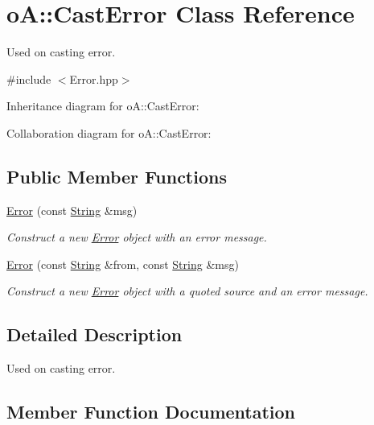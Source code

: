 \hypertarget{classo_a_1_1_cast_error}{}\section{oA\+:\+:Cast\+Error Class Reference}
\label{classo_a_1_1_cast_error}


Used on casting error.  




{\ttfamily \#include $<$Error.\+hpp$>$}



Inheritance diagram for oA\+:\+:Cast\+Error\+:


Collaboration diagram for oA\+:\+:Cast\+Error\+:
\subsection*{Public Member Functions}
\begin{DoxyCompactItemize}
\item 
\mbox{\hyperlink{classo_a_1_1_cast_error_a16d10704561d2b756722d71d8703089c}{Error}} (const \mbox{\hyperlink{classo_a_1_1_string}{String}} \&msg)
\begin{DoxyCompactList}\small\item\em Construct a new \mbox{\hyperlink{classo_a_1_1_error}{Error}} object with an error message. \end{DoxyCompactList}\item 
\mbox{\hyperlink{classo_a_1_1_cast_error_adf66492ca8b03fa14d09e5bba7cdacbd}{Error}} (const \mbox{\hyperlink{classo_a_1_1_string}{String}} \&from, const \mbox{\hyperlink{classo_a_1_1_string}{String}} \&msg)
\begin{DoxyCompactList}\small\item\em Construct a new \mbox{\hyperlink{classo_a_1_1_error}{Error}} object with a quoted source and an error message. \end{DoxyCompactList}\end{DoxyCompactItemize}


\subsection{Detailed Description}
Used on casting error. 

\subsection{Member Function Documentation}
\mbox{\label{classo_a_1_1_cast_error_a16d10704561d2b756722d71d8703089c}} 
